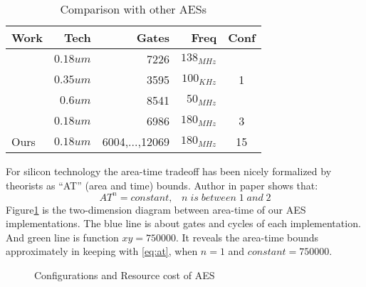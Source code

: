 \begin{table}[h]
\centering
\caption{Comparison with other AESs}
\begin{tabular}{|l|r|r|r|c|}\hline
Work & Tech & Gates & Freq & Conf \\ \hline
\cite{Akashi:AES} & $0.18um$ & 7226 & $138_{MHz}$ &  \\ \cline{1-4}
\cite{Martin:AES} & $0.35um$ & 3595 & $100_{KHz}$ & 1\\ \cline{1-4}
\cite{Norbert:AES} & $0.6um$ & 8541 & $50_{MHz}$ & \\ \hline
\cite{Yibo:AES} & $0.18um$ & 6986 & $180_{MHz}$ & 3 \\ \hline
Ours & $0.18um$ & 6004,...,12069 & $180_{MHz}$ & 15 \\ \hline
\end{tabular}
\label{table:com}
\end{table}
For silicon technology the area-time tradeoff has been nicely formalized by theorists as ``AT'' (area and time) bounds. Author in paper\cite{AT} shows that:
\begin{equation}
AT^n = constant, \;\;\;n\; is\; between\; 1\; and\; 2
\label{eq:at}
\end{equation}
Figure\ref{fig-mesure} is the two-dimension diagram between area-time of our AES implementations. The blue line is about gates and cycles of each implementation. And green line is function $xy=750000$. It reveals the area-time bounds approximately in keeping with \eqref{eq:at}, when $n=1$ and $constant = 750000$.
\begin{figure}[thbp]
\centering
{}
\caption{Configurations and Resource cost of AES}
\label{fig-mesure}
\end{figure}
